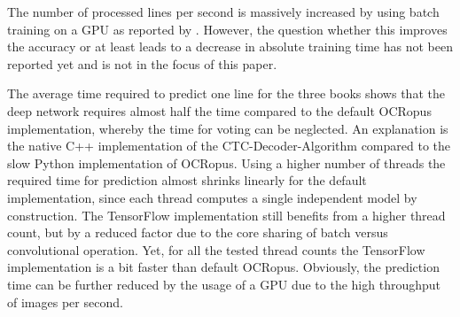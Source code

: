\documentclass{jlcl}
\begin{document}
The number of processed lines per second is massively increased by using batch training on a GPU as reported by \cite{breuel17hybridCNN-LSTM}.
However, the question whether this improves the accuracy or at least leads to a decrease in absolute training time has not been reported yet and is not in the focus of this paper.

The average time required to predict one line for the three books shows that the deep network requires almost half the time compared to the default OCRopus implementation, whereby the time for voting can be neglected.
An explanation is the native C++ implementation of the CTC-Decoder-Algorithm compared to the slow Python implementation of OCRopus.
Using a higher number of threads the required time for prediction almost shrinks linearly for the default implementation, since each thread computes a single independent model by construction.
The TensorFlow implementation still benefits from a higher thread count, but by a reduced factor due to the core sharing of batch versus convolutional operation.
Yet, for all the tested thread counts the TensorFlow implementation is a bit faster than default OCRopus.
Obviously, the prediction time can be further reduced by the usage of a GPU due to the high throughput of images per second.
\end{document}
